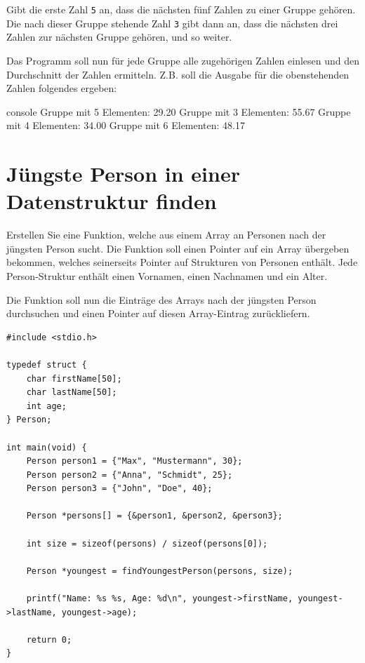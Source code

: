 Gibt die erste Zahl \texttt{5} an, dass die nächsten fünf Zahlen zu
einer Gruppe gehören. Die nach dieser Gruppe stehende Zahl \texttt{3}
gibt dann an, dass die nächsten drei Zahlen zur nächsten Gruppe gehören, und so
weiter.

Das Programm soll nun für jede Gruppe alle zugehörigen Zahlen einlesen und den
Durchschnitt der Zahlen ermitteln. Z.B. soll die Ausgabe für die obenstehenden
Zahlen folgendes ergeben:

\begin{mybox}[Bildschirmausgabe]{console}
Gruppe mit 5 Elementen: 29.20
Gruppe mit 3 Elementen: 55.67
Gruppe mit 4 Elementen: 34.00
Gruppe mit 6 Elementen: 48.17
\end{mybox}




\chapter{Jüngste Person in einer Datenstruktur finden}

\vspace{10pt}

Erstellen Sie eine Funktion, welche aus einem Array an Personen nach der
jüngsten Person sucht. Die Funktion soll einen Pointer auf ein Array übergeben
bekommen, welches seinerseits Pointer auf Strukturen von Personen enthält. Jede
Person-Struktur enthält einen Vornamen, einen Nachnamen und ein Alter.

Die Funktion soll nun die Einträge des Arrays nach der jüngsten Person
durchsuchen und einen Pointer auf diesen Array-Eintrag zurückliefern.

\Vorlage
\begin{verbatim}
#include <stdio.h>

typedef struct {
    char firstName[50];
    char lastName[50];
    int age;
} Person;

int main(void) {
    Person person1 = {"Max", "Mustermann", 30};
    Person person2 = {"Anna", "Schmidt", 25};
    Person person3 = {"John", "Doe", 40};

    Person *persons[] = {&person1, &person2, &person3};

    int size = sizeof(persons) / sizeof(persons[0]);

    Person *youngest = findYoungestPerson(persons, size);

    printf("Name: %s %s, Age: %d\n", youngest->firstName, youngest->lastName, youngest->age);

    return 0;
}
\end{verbatim}

